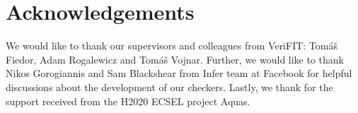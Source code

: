 \documentclass{ExcelAtFIT}
\begin{document}



\section*{Acknowledgements}
We would like to thank our supervisors and
colleagues from VeriFIT: Tomáš Fiedor,
Adam Rogalewicz and Tomáš Vojnar. Further, we
would like to thank Nikos Gorogiannis and Sam Blackshear
from Infer team at Facebook for helpful discussions
about the development of our checkers. Lastly, we thank
for the support received from the H2020 ECSEL project Aquas.




\end{document}
